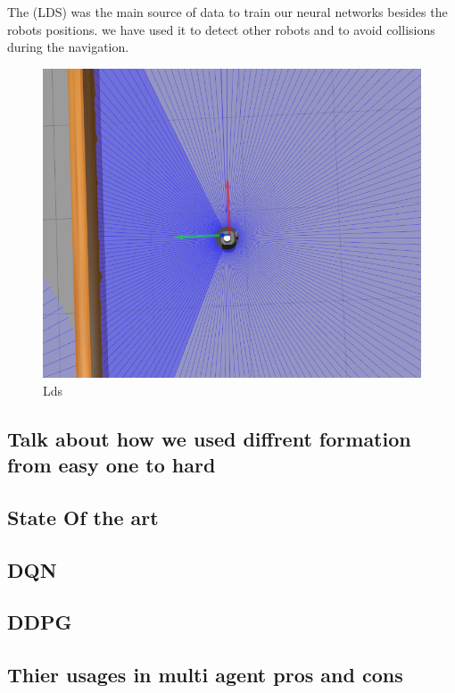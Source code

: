 \documentclass[12pt]{extarticle}
\begin{document}
The (LDS) was the main source of data to train our neural networks besides the robots positions. we have used it to detect other robots and to avoid collisions during the navigation.  
   


 \begin{figure}[h]  
\centering
\includegraphics[scale=0.4]{lds.png}
\caption[Lds]{Lds}
\end{figure}


 
  



\subsection{Talk about how we used diffrent formation from easy one to hard}








\subsection{State Of the art}
\subsection{DQN}
\subsection{DDPG}
\subsection{Thier usages in multi agent pros and cons}
\end{document}
